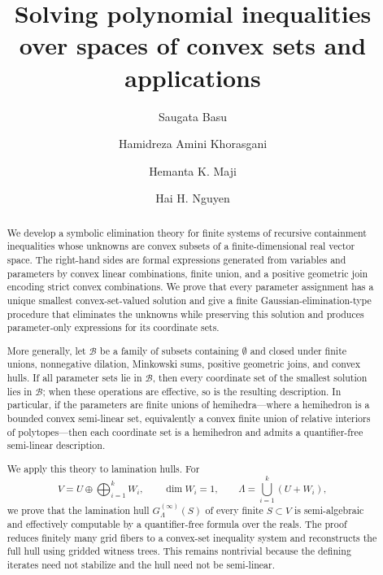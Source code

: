 \documentclass[10pt]{amsart}
\theoremstyle{plain}
\theoremstyle{definition}
\begin{document}
\title{
        Solving polynomial inequalities over spaces of convex sets and applications
    }
  
\author{Saugata Basu}
\address{Department of Mathematics,
Purdue University, West Lafayette, IN 47906, U.S.A.}

\author{Hamidreza Amini Khorasgani}
\address{Department of Computer Science,
Purdue University, West Lafayette, IN 47906, U.S.A.}

\author{Hemanta K. Maji}
\address{Department of Computer Science,
Purdue University, West Lafayette, IN 47906, U.S.A.}

\author{Hai H. Nguyen}
\address{Center for Quantum Technologies, 
 National University of Singapore, Singapore}



\begin{abstract}
We develop a symbolic elimination theory for finite systems of recursive
containment inequalities whose unknowns are convex subsets of a
finite-dimensional real vector space. The right-hand sides are formal
expressions generated from variables and parameters by 
convex linear combinations,
finite union, and a positive geometric join encoding strict
convex combinations. We prove that every parameter assignment has a unique
smallest convex-set-valued solution and give a finite
Gaussian-elimination-type procedure that eliminates the unknowns while
preserving this solution and produces parameter-only expressions for its
coordinate sets.

More generally, let \(\mathcal B\) be a family of subsets 
containing \(\emptyset\) and 
closed under finite unions, nonnegative dilation, Minkowski
sums, positive geometric joins, and convex hulls. If all parameter sets lie in
\(\mathcal B\), then every coordinate set of the smallest solution lies in
\(\mathcal B\); when these operations are effective, so is the resulting
description. In particular, if the parameters are finite unions of
hemihedra---where a hemihedron is a bounded convex semi-linear set,
equivalently a convex finite union of relative interiors of polytopes---then
each coordinate set is a hemihedron and admits a quantifier-free semi-linear
description.

We apply this theory to lamination hulls. For
\[
V=U\oplus\bigoplus_{i=1}^{k}W_i,\qquad
\dim W_i=1,\qquad
\Lambda=\bigcup_{i=1}^{k}(U+W_i),
\]
we prove that the lamination hull \(G_{\Lambda}^{(\infty)}(S)\) of every
finite \(S\subset V\) is semi-algebraic and effectively computable by a
quantifier-free formula over the reals. The proof reduces finitely many grid
fibers to a convex-set inequality system and reconstructs the full hull using
gridded witness trees. This remains nontrivial because the defining iterates
need not stabilize and the hull need not be semi-linear.
\end{abstract}
\maketitle
\end{document}
